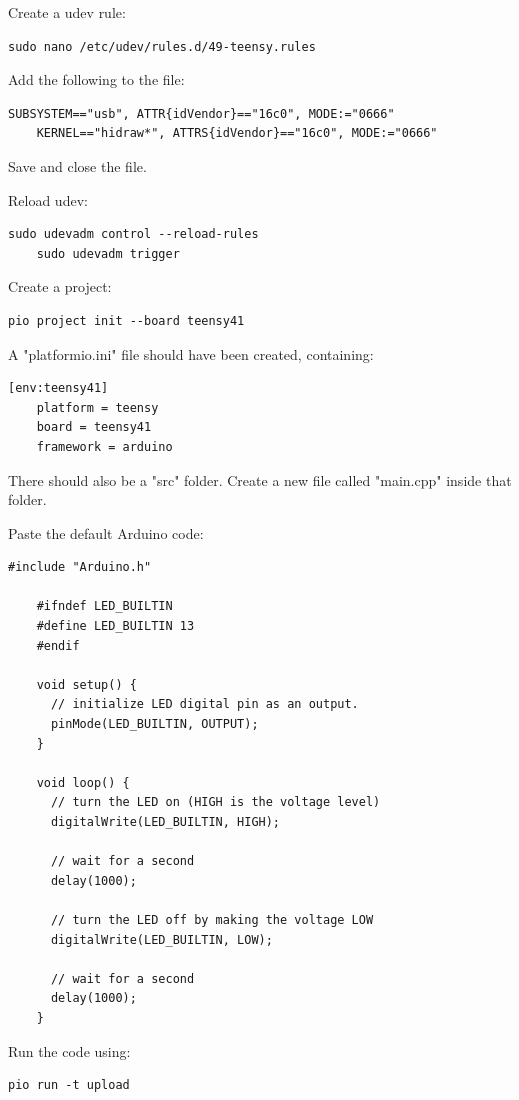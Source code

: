 \documentclass[ti,oneside,10pt]{uantwerpenreport}
\begin{document}
Create a udev rule:
\begin{lstlisting}[style=cmd]
    sudo nano /etc/udev/rules.d/49-teensy.rules
\end{lstlisting}

Add the following to the file:
\begin{lstlisting}[style=script]
    SUBSYSTEM=="usb", ATTR{idVendor}=="16c0", MODE:="0666"
    KERNEL=="hidraw*", ATTRS{idVendor}=="16c0", MODE:="0666"
\end{lstlisting}

Save and close the file.

Reload udev:
\begin{lstlisting}[style=cmd]
    sudo udevadm control --reload-rules
    sudo udevadm trigger
\end{lstlisting}

Create a project:
\begin{lstlisting}[style=cmd]
    pio project init --board teensy41
\end{lstlisting}

A "platformio.ini" file should have been created, containing:
\begin{lstlisting}[style=platformio]
    [env:teensy41]
    platform = teensy
    board = teensy41
    framework = arduino
\end{lstlisting}

There should also be a "src" folder.
Create a new file called "main.cpp" inside that folder.

Paste the default Arduino code:
\begin{lstlisting}[style=platformio]
    #include "Arduino.h"

    #ifndef LED_BUILTIN
    #define LED_BUILTIN 13
    #endif

    void setup() {
      // initialize LED digital pin as an output.
      pinMode(LED_BUILTIN, OUTPUT);
    }

    void loop() {
      // turn the LED on (HIGH is the voltage level)
      digitalWrite(LED_BUILTIN, HIGH);

      // wait for a second
      delay(1000);

      // turn the LED off by making the voltage LOW
      digitalWrite(LED_BUILTIN, LOW);

      // wait for a second
      delay(1000);
    }
\end{lstlisting}

Run the code using:
\begin{lstlisting}[style=cmd]
    pio run -t upload
\end{lstlisting}
\end{document}
